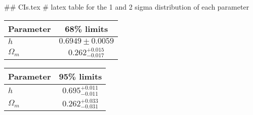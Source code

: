 ## CIs.tex
# latex table for the 1 and 2 sigma distribution of each parameter

\begin{tabular} { l  c}
 Parameter &  68\% limits\\
\hline
{\boldmath$h              $} & $0.6949\pm 0.0059          $\\
{\boldmath$\Omega_m       $} & $0.262^{+0.015}_{-0.017}   $\\
\hline
\end{tabular}

\begin{tabular} { l  c}
 Parameter &  95\% limits\\
\hline
{\boldmath$h              $} & $0.695^{+0.011}_{-0.011}   $\\
{\boldmath$\Omega_m       $} & $0.262^{+0.033}_{-0.031}   $\\
\hline
\end{tabular}
